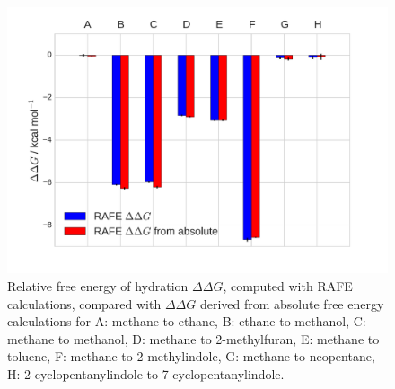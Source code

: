 \documentclass[journal=jctcce,manuscript=suppinfo]{achemso}
\begin{document}
\begin{figure}[ht]
  \includegraphics[width=\textwidth]{figures/sire_histogram.pdf}
  \caption{Relative free energy of hydration $\Delta\Delta G$, computed with RAFE calculations, compared with $\Delta\Delta G$ derived from absolute free  energy calculations for A: methane to ethane, B: ethane to methanol, C: methane to methanol, D: methane to 2-methylfuran, E: methane to toluene,
    F: methane to 2-methylindole, G: methane to neopentane, H: 
    2-cyclopentanylindole to 7-cyclopentanylindole.}
  \label{fig:sire_histogram}
\end{figure}
\end{document}
